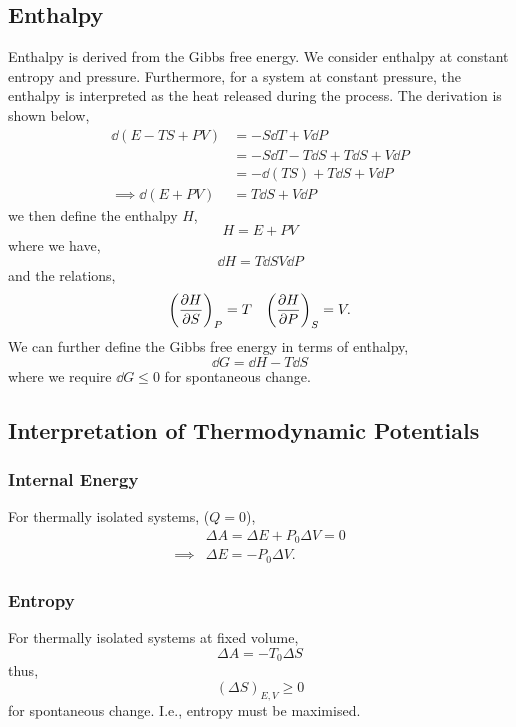 \documentclass{book}
\begin{document}
\subsection{Enthalpy}
Enthalpy is derived from the Gibbs free energy. We consider enthalpy at constant entropy and pressure. Furthermore, for a system at constant pressure, the enthalpy is interpreted as the heat released during the process. The derivation is shown below,
\begin{equation}
	\begin{split}
	\dd{(E - TS + PV)} & = -S \dd{T} + V\dd{P} \\
	& = -S\dd{T} -T\dd{S} + T\dd{S} + V\dd{P} \\
	& = - \dd{(TS)} + T\dd{S} + V\dd{P} \\
	\implies \dd{(E + PV)} & = T\dd{S} + V\dd{P}
	\end{split}
\end{equation}
we then define the enthalpy $H$,
\begin{equation}
	H = E + PV
\end{equation}
where we have,
\begin{equation}
	\boxed{\dd{H} = T\dd{S} V\dd{P}}
\end{equation}
and the relations,
\begin{align}
	\left(\pdv{H}{S}\right)_P = T && \left(\pdv{H}{P}\right)_S = V.
\end{align}
We can further define the Gibbs free energy in terms of enthalpy,
\begin{equation}
	\dd{G} = \dd{H} - T\dd{S}
\end{equation}
where we require $\dd{G} \leq 0$ for spontaneous change.
\subsection{Interpretation of Thermodynamic Potentials}
\subsubsection{Internal Energy}
For thermally isolated systems, ($Q = 0$),
\begin{equation}
	\begin{split}
	& \Delta A = \Delta E + P_0\Delta V = 0 \\
	\implies & \Delta E = - P_0 \Delta V.
	\end{split}
\end{equation}
\subsubsection{Entropy}
For thermally isolated systems at fixed volume,
\begin{equation}
	\Delta A = - T_0 \Delta S
\end{equation}
thus,
\begin{equation}
	(\Delta S)_{E,V} \geq 0
\end{equation}
for spontaneous change. I.e., entropy must be maximised.
\end{document}
